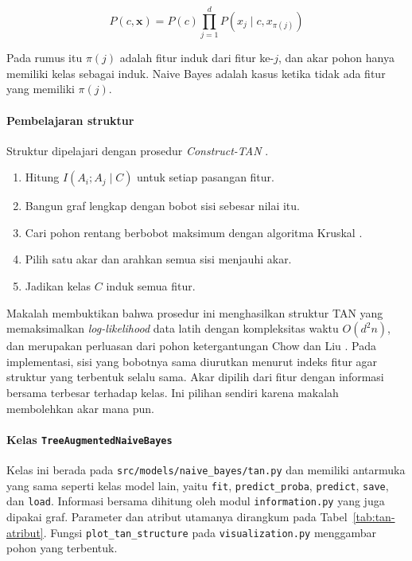 \[
P(c,\mathbf{x})=P(c)\prod_{j=1}^{d}P\left(x_j\mid c,x_{\pi(j)}\right)
\]

Pada rumus itu $\pi(j)$ adalah fitur induk dari fitur ke-$j$, dan akar pohon hanya memiliki kelas sebagai induk. Naive Bayes adalah kasus ketika tidak ada fitur yang memiliki $\pi(j)$.

\paragraph{Pembelajaran struktur}
Struktur dipelajari dengan prosedur \textit{Construct-TAN} \cite{ref:friedman-1997}.

\begin{enumerate}
    \item Hitung $I(A_i;A_j\mid C)$ untuk setiap pasangan fitur.
    \item Bangun graf lengkap dengan bobot sisi sebesar nilai itu.
    \item Cari pohon rentang berbobot maksimum dengan algoritma Kruskal \cite{ref:kruskal-1956}.
    \item Pilih satu akar dan arahkan semua sisi menjauhi akar.
    \item Jadikan kelas $C$ induk semua fitur.
\end{enumerate}

Makalah membuktikan bahwa prosedur ini menghasilkan struktur TAN yang memaksimalkan \textit{log-likelihood} data latih dengan kompleksitas waktu $O(d^2 n)$, dan merupakan perluasan dari pohon ketergantungan Chow dan Liu \cite{ref:chow-1968}. Pada implementasi, sisi yang bobotnya sama diurutkan menurut indeks fitur agar struktur yang terbentuk selalu sama. Akar dipilih dari fitur dengan informasi bersama terbesar terhadap kelas. Ini pilihan sendiri karena makalah membolehkan akar mana pun.

\paragraph{Kelas \texttt{TreeAugmentedNaiveBayes}}
Kelas ini berada pada \texttt{src/models/\allowbreak naive\_\allowbreak bayes/\allowbreak tan.py} dan memiliki antarmuka yang sama seperti kelas model lain, yaitu \texttt{fit}, \texttt{predict\_proba}, \texttt{predict}, \texttt{save}, dan \texttt{load}. Informasi bersama dihitung oleh modul \texttt{information.py} yang juga dipakai graf. Parameter dan atribut utamanya dirangkum pada Tabel~\ref{tab:tan-atribut}. Fungsi \texttt{plot\_tan\_structure} pada \texttt{visualization.py} menggambar pohon yang terbentuk.

